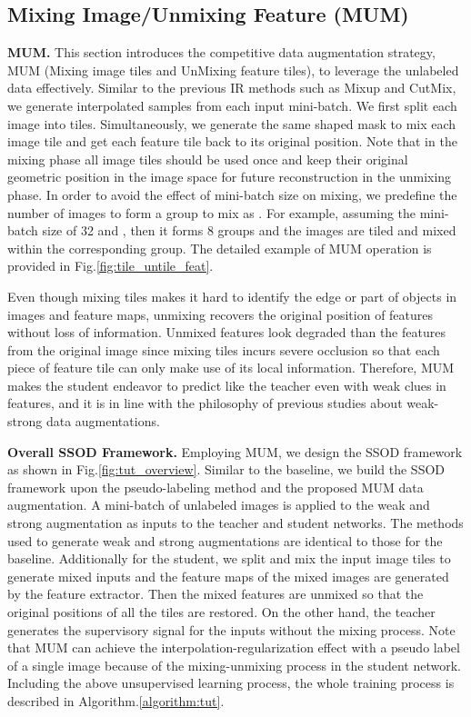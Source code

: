 \documentclass[10pt,twocolumn,letterpaper]{article}
\begin{document}
\subsection{Mixing Image/Unmixing Feature (MUM)}
\noindent\textbf{MUM.} This section introduces the competitive data augmentation strategy, MUM (Mixing image tiles and UnMixing feature tiles), to leverage the unlabeled data effectively.
Similar to the previous IR methods such as Mixup\cite{zhang2017mixup} and CutMix\cite{cutmix}, we generate interpolated samples from each input mini-batch. 
We first split each image into  tiles. Simultaneously, we generate the same shaped  mask to mix each image tile and get each feature tile back to its original position.
Note that in the mixing phase all image tiles should be used once and keep their original geometric position in the image space for future reconstruction in the unmixing phase.
In order to avoid the effect of mini-batch size on mixing, we predefine the number of images to form a group to mix as .
For example, assuming the mini-batch size of 32 and , then it forms 8 groups and the images are tiled and mixed within the corresponding group.
The detailed example of MUM operation is provided in Fig.\ref{fig:tile_untile_feat}.

Even though mixing tiles makes it hard to identify the edge or part of objects in images and feature maps, unmixing recovers the original position of features without loss of information.
Unmixed features look degraded than the features from the original image since mixing tiles incurs severe occlusion so that each piece of feature tile can only make use of its local information.
Therefore, MUM makes the student endeavor to predict like the teacher even with weak clues in features, and it is in line with the philosophy of previous studies\cite{sohn2020fixmatch, xie2019unsupervised, kim2020structured} about weak-strong data augmentations.

\noindent\textbf{Overall SSOD Framework.} Employing MUM, we design the SSOD framework as shown in Fig.\ref{fig:tut_overview}.
Similar to the baseline, we build the SSOD framework upon the pseudo-labeling method and the proposed MUM data augmentation.
A mini-batch of unlabeled images is applied to the weak and strong augmentation as inputs to the teacher and student networks. 
The methods used to generate weak and strong augmentations are identical to those for the baseline\cite{liu2021unbiased}.
Additionally for the student, we split and mix the input image tiles to generate mixed inputs and the feature maps of the mixed images are generated by the feature extractor. 
Then the mixed features are unmixed so that the original positions of all the tiles are restored.
On the other hand, the teacher generates the supervisory signal for the inputs without the mixing process.
Note that MUM can achieve the interpolation-regularization effect with a pseudo label of a single image because of the mixing-unmixing process in the student network.
Including the above unsupervised learning process, the whole training process is described in Algorithm.\ref{algorithm:tut}.
\end{document}
